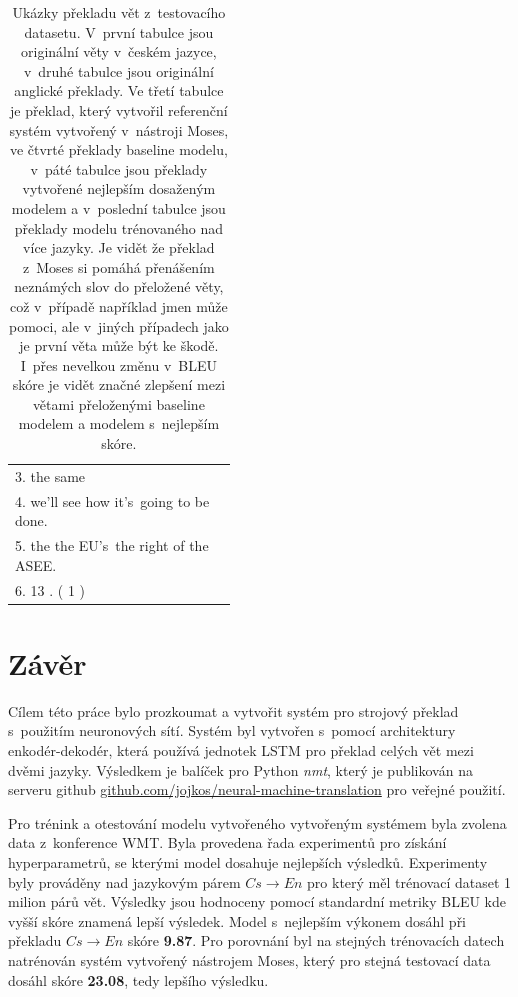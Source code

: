 \begin{table}[H]
\begin{center}
\begin{tabular}{p{0.44\linewidth}}
          3. the same \\
          4. we'll see how it's~going to be done. \\
          5. the the EU's~the right of the ASEE. \\
          6. 13 . ( 1 ) \\
          \bottomrule
        \end{tabular}
    \end{center}
	\caption{Ukázky překladu vět z~testovacího datasetu. V~první tabulce jsou originální věty v~českém jazyce, v~druhé tabulce jsou originální anglické překlady. Ve třetí tabulce je překlad, který vytvořil referenční systém vytvořený v~nástroji Moses, ve čtvrté překlady baseline modelu, v~páté tabulce jsou překlady vytvořené nejlepším dosaženým modelem a v~poslední tabulce jsou překlady modelu trénovaného nad více jazyky. Je vidět že překlad z~Moses si pomáhá přenášením neznámých slov do přeložené věty, což v~případě například jmen může pomoci, ale v~jiných případech jako je první věta může být ke škodě. I~přes nevelkou změnu v~BLEU skóre je vidět značné zlepšení mezi větami přeloženými baseline modelem a modelem s~nejlepším skóre.}
	\label{img:exampleResults}
\end{table}

\chapter{Závěr}
Cílem této práce bylo prozkoumat a vytvořit systém pro strojový překlad s~použitím neuronových sítí. Systém byl vytvořen s~pomocí architektury enkodér-dekodér, která používá jednotek LSTM pro překlad celých vět mezi dvěmi jazyky. Výsledkem je balíček pro Python \emph{nmt}, který je publikován na serveru github \url{github.com/jojkos/neural-machine-translation} pro veřejné použití.

Pro trénink a otestování modelu vytvořeného vytvořeným systémem byla zvolena data z~konference WMT. Byla provedena řada experimentů pro získání hyperparametrů, se kterými model dosahuje nejlepších výsledků. Experimenty byly prováděny nad jazykovým párem $Cs\rightarrow En$ pro který měl trénovací dataset 1 milion párů vět. Výsledky jsou hodnoceny pomocí standardní metriky BLEU kde vyšší skóre znamená lepší výsledek. Model s~nejlepším výkonem dosáhl při překladu $Cs\rightarrow En$ skóre \textbf{9.87}. Pro porovnání byl na stejných trénovacích datech natrénován systém vytvořený nástrojem Moses, který pro stejná testovací data dosáhl skóre \textbf{23.08}, tedy lepšího výsledku.

